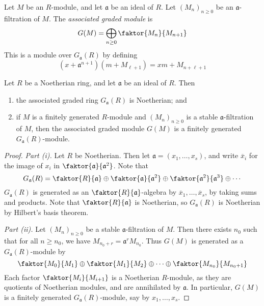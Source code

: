 \begin{definition}
    Let \( M \) be an \( R \)-module, and let \( \mathfrak a \) be an ideal of \( R \).
    Let \( (M_n)_{n \geq 0} \) be an \( \mathfrak a \)-filtration of \( M \).
    The \emph{associated graded module} is
    \[ G(M) = \bigoplus_{n \geq 0} \faktor{M_n}{M_{n+1}} \]
    This is a module over \( G_{\mathfrak a}(R) \) by defining
    \[ (x + \mathfrak a^{n+1})(m + M_{\ell + 1}) = xm + M_{n+\ell+1} \]
\end{definition}
\begin{proposition}
    Let \( R \) be a Noetherian ring, and let \( \mathfrak a \) be an ideal of \( R \).
    Then
    \begin{enumerate}
        \item the associated graded ring \( G_{\mathfrak a}(R) \) is Noetherian; and
        \item if \( M \) is a finitely generated \( R \)-module and \( (M_n)_{n \geq 0} \) is a stable \( \mathfrak a \)-filtration of \( M \), then the associated graded module \( G(M) \) is a finitely generated \( G_{\mathfrak a}(R) \)-module.
    \end{enumerate}
\end{proposition}
\begin{proof}
    \emph{Part (i).}
    Let \( R \) be Noetherian.
    Then let \( \mathfrak a = (x_1, \dots, x_s) \), and write \( \overline x_i \) for the image of \( x_i \) in \( \faktor{\mathfrak a}{\mathfrak a^2} \).
    Note that
    \[ G_{\mathfrak a}(R) = \faktor{R}{\mathfrak a} \oplus \faktor{\mathfrak a}{\mathfrak a^2} \oplus \faktor{\mathfrak a^2}{\mathfrak a^3} \oplus \cdots \]
    \( G_{\mathfrak a}(R) \) is generated as an \( \faktor{R}{\mathfrak a} \)-algebra by \( \overline x_1, \dots, \overline x_s \), by taking sums and products.
    Note that \( \faktor{R}{\mathfrak a} \) is Noetherian, so \( G_{\mathfrak a}(R) \) is Noetherian by Hilbert's basis theorem.

    \emph{Part (ii).}
    Let \( (M_n)_{n \geq 0} \) be a stable \( \mathfrak a \)-filtration of \( M \).
    Then there exists \( n_0 \) such that for all \( n \geq n_0 \), we have \( M_{n_0 + r} = \mathfrak a^r M_{n_0} \).
    Thus \( G(M) \) is generated as a \( G_{\mathfrak a}(R) \)-module by
    \[ \faktor{M_0}{M_1} \oplus \faktor{M_1}{M_2} \oplus \dots \oplus \faktor{M_{n_0}}{M_{n_0 + 1}} \]
    Each factor \( \faktor{M_i}{M_{i+1}} \) is a Noetherian \( R \)-module, as they are quotients of Noetherian modules, and are annihilated by \( \mathfrak a \).
    In particular, \( G(M) \) is a finitely generated \( G_{\mathfrak a}(R) \)-module, say by \( x_1, \dots, x_s \).
\end{proof}

